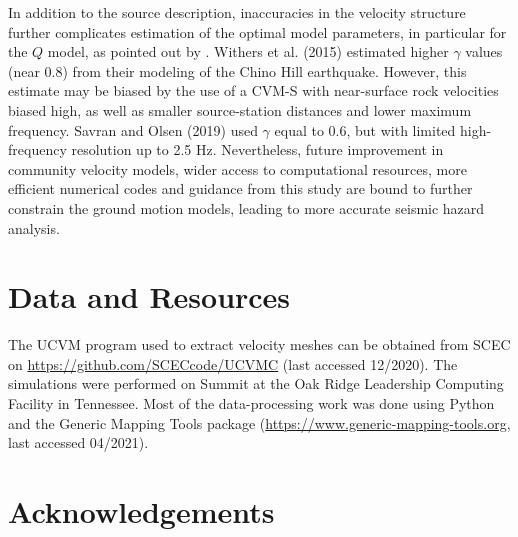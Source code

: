 
In addition to the source description, inaccuracies in the velocity structure further complicates estimation of the optimal model parameters, in particular for the $Q$ model, as pointed out by . Withers et al. (2015) estimated higher $\gamma$ values (near 0.8) from their modeling of the Chino Hill earthquake. However, this estimate may be biased by the use of a CVM-S with near-surface rock velocities biased high, as well as smaller source-station distances and lower maximum frequency. Savran and Olsen (2019) used $\gamma$ equal to 0.6, but with limited high-frequency resolution up to 2.5 Hz. 
Nevertheless, future improvement in community velocity models, wider access to computational resources, more efficient numerical codes and guidance from this study are bound to further constrain the ground motion models, leading to more accurate seismic hazard analysis.



\section*{Data and Resources}
The UCVM program used to extract velocity meshes can be obtained from SCEC on \url{https://github.com/SCECcode/UCVMC} (last accessed 12/2020). The simulations were performed on Summit at the Oak Ridge Leadership Computing Facility in Tennessee. Most of the data-processing work was done using Python and the Generic Mapping Tools package (\url{https://www.generic-mapping-tools.org}, last accessed 04/2021).


\section*{Acknowledgements}

